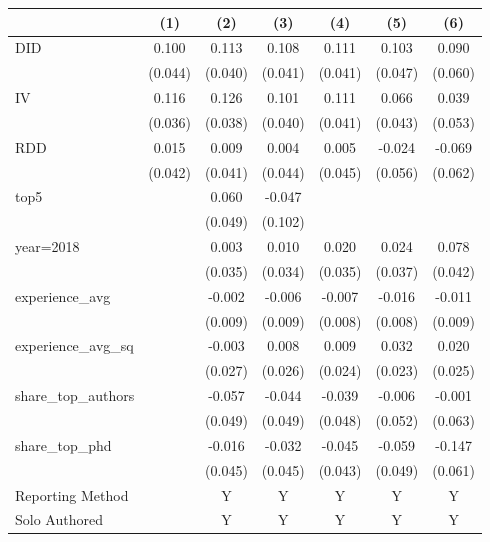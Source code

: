 \begin{tabular}{l*{6}{c}}
\hline\hline
                &\multicolumn{1}{c}{(1)}&\multicolumn{1}{c}{(2)}&\multicolumn{1}{c}{(3)}&\multicolumn{1}{c}{(4)}&\multicolumn{1}{c}{(5)}&\multicolumn{1}{c}{(6)}\\
\hline
DID             &    0.100&    0.113&    0.108&    0.111&    0.103&    0.090\\
                &  (0.044)&  (0.040)&  (0.041)&  (0.041)&  (0.047)&  (0.060)\\
IV              &    0.116&    0.126&    0.101&    0.111&    0.066&    0.039\\
                &  (0.036)&  (0.038)&  (0.040)&  (0.041)&  (0.043)&  (0.053)\\
RDD             &    0.015&    0.009&    0.004&    0.005&   -0.024&   -0.069\\
                &  (0.042)&  (0.041)&  (0.044)&  (0.045)&  (0.056)&  (0.062)\\
top5            &         &    0.060&   -0.047&         &         &         \\
                &         &  (0.049)&  (0.102)&         &         &         \\
year=2018       &         &    0.003&    0.010&    0.020&    0.024&    0.078\\
                &         &  (0.035)&  (0.034)&  (0.035)&  (0.037)&  (0.042)\\
experience\_avg  &         &   -0.002&   -0.006&   -0.007&   -0.016&   -0.011\\
                &         &  (0.009)&  (0.009)&  (0.008)&  (0.008)&  (0.009)\\
experience\_avg\_sq&         &   -0.003&    0.008&    0.009&    0.032&    0.020\\
                &         &  (0.027)&  (0.026)&  (0.024)&  (0.023)&  (0.025)\\
share\_top\_authors&         &   -0.057&   -0.044&   -0.039&   -0.006&   -0.001\\
                &         &  (0.049)&  (0.049)&  (0.048)&  (0.052)&  (0.063)\\
share\_top\_phd   &         &   -0.016&   -0.032&   -0.045&   -0.059&   -0.147\\
                &         &  (0.045)&  (0.045)&  (0.043)&  (0.049)&  (0.061)\\
Reporting Method &         &        Y&        Y&        Y&        Y&        Y\\
Solo Authored   &         &        Y&        Y&        Y&        Y&        Y\\

\end{tabular}
